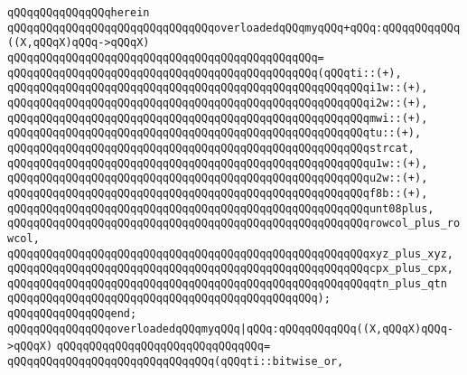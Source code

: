 \verb|qQQqqQQqqQQqqQQqherein|\newline
\verb|qQQqqQQqqQQqqQQqqQQqqQQqqQQqqQQqoverloadedqQQqmyqQQq+qQQq:qQQqqQQqqQQq((X,qQQqX)qQQq->qQQqX)|\newline
\verb|qQQqqQQqqQQqqQQqqQQqqQQqqQQqqQQqqQQqqQQqqQQqqQQq=|\newline
\verb|qQQqqQQqqQQqqQQqqQQqqQQqqQQqqQQqqQQqqQQqqQQqqQQq(qQQqti::(+),|\newline
\verb|qQQqqQQqqQQqqQQqqQQqqQQqqQQqqQQqqQQqqQQqqQQqqQQqqQQqqQQqi1w::(+),|\newline
\verb|qQQqqQQqqQQqqQQqqQQqqQQqqQQqqQQqqQQqqQQqqQQqqQQqqQQqqQQqi2w::(+),|\newline
\verb|qQQqqQQqqQQqqQQqqQQqqQQqqQQqqQQqqQQqqQQqqQQqqQQqqQQqqQQqmwi::(+),|\newline
\verb|qQQqqQQqqQQqqQQqqQQqqQQqqQQqqQQqqQQqqQQqqQQqqQQqqQQqqQQqtu::(+),|\newline
\verb|qQQqqQQqqQQqqQQqqQQqqQQqqQQqqQQqqQQqqQQqqQQqqQQqqQQqqQQqstrcat,|\newline
\verb|qQQqqQQqqQQqqQQqqQQqqQQqqQQqqQQqqQQqqQQqqQQqqQQqqQQqqQQqu1w::(+),|\newline
\verb|qQQqqQQqqQQqqQQqqQQqqQQqqQQqqQQqqQQqqQQqqQQqqQQqqQQqqQQqu2w::(+),|\newline
\verb|qQQqqQQqqQQqqQQqqQQqqQQqqQQqqQQqqQQqqQQqqQQqqQQqqQQqqQQqf8b::(+),|\newline
\verb|qQQqqQQqqQQqqQQqqQQqqQQqqQQqqQQqqQQqqQQqqQQqqQQqqQQqqQQqunt08plus,|\newline
\verb|qQQqqQQqqQQqqQQqqQQqqQQqqQQqqQQqqQQqqQQqqQQqqQQqqQQqqQQqrowcol_plus_rowcol,|\newline
\verb|qQQqqQQqqQQqqQQqqQQqqQQqqQQqqQQqqQQqqQQqqQQqqQQqqQQqqQQqxyz_plus_xyz,|\newline
\verb|qQQqqQQqqQQqqQQqqQQqqQQqqQQqqQQqqQQqqQQqqQQqqQQqqQQqqQQqcpx_plus_cpx,|\newline
\verb|qQQqqQQqqQQqqQQqqQQqqQQqqQQqqQQqqQQqqQQqqQQqqQQqqQQqqQQqqtn_plus_qtn|\newline
\verb|qQQqqQQqqQQqqQQqqQQqqQQqqQQqqQQqqQQqqQQqqQQqqQQq);|\newline
\verb|qQQqqQQqqQQqqQQqend;|\newline
\newline
\verb|qQQqqQQqqQQqqQQqoverloadedqQQqmyqQQq|\verb#|qQQq:qQQqqQQqqQQq((X,qQQqX)qQQq->qQQqX)#\newline
\verb|qQQqqQQqqQQqqQQqqQQqqQQqqQQqqQQq=|\newline
\verb|qQQqqQQqqQQqqQQqqQQqqQQqqQQqqQQq(qQQqti::bitwise_or,|\newline

